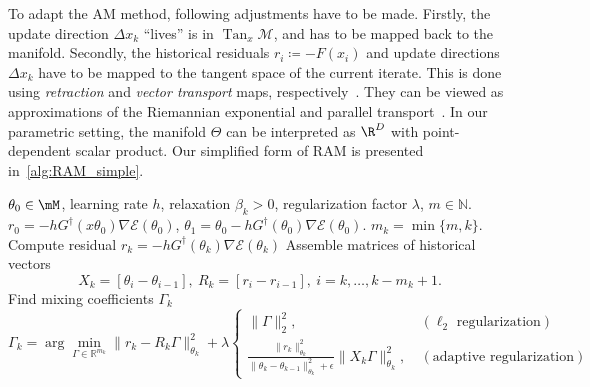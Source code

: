 \documentclass{article} %
\numberwithin{equation}{subsection}
\numberwithin{theorem}{section}
\newcommand{\cE}{\mathcal{E}}
\newcommand{\cM}{\mathcal{M}}
\begin{document}
            To adapt the AM method, following adjustments have to be made.
            Firstly, the update direction $\Delta x_k$ ``lives'' is in $\operatorname{Tan}_x{\cM}$, and has to be mapped back to the manifold.
            Secondly, the historical residuals $r_i \coloneqq  -F(x_i)$ and update directions $\Delta x_k$ have to be mapped to the tangent space of the current iterate.
            This is done using \emph{retraction} and \emph{vector transport} maps, respectively~\cite{absil2009optimization}.
            They can be viewed as approximations of the Riemannian exponential and parallel transport~\cite{absil2009optimization}.
            In our parametric setting, the manifold $\Theta$ can be interpreted as $\R^D$ with point-dependent scalar product. 
            Our simplified form of RAM is presented in~\autoref{alg:RAM_simple}.
            \begin{algorithm}[ht]
            \caption{Riemannian Anderson Mixing on $\Theta$}
            \label{alg:RAM_simple}
            \begin{algorithmic}[1]
                \REQUIRE $\theta_0 \in\mM$, 
                    learning rate $h$, 
                    relaxation $\beta_k > 0$, 
                    regularization factor $\lambda$,
                    $m\in\mathbb{N}$.
                \STATE $r_0 = -hG^\dagger(x\theta_0)\nabla\cE(\theta_0)$,
                $\theta_1 = \theta_0 -hG^\dagger(\theta_0)\nabla\cE(\theta_0)$.
                \STATE $m_k = \min\{m,k\}$.
                \STATE Compute residual $r_k = -hG^\dagger(\theta_k)\nabla \cE(\theta_k)$
                \STATE Assemble matrices of historical vectors
                    $$
                        X_k = \left[\theta_i - \theta_{i - 1}\right],\ 
                        R_k = \left[r_i - r_{i - 1}\right],\
                            i = k,\ldots,k - m_k + 1.
                    $$
                \STATE Find mixing coefficients $\Gamma_k$ \vspace{-10pt}
                \begin{equation*}
                    \Gamma_k = 
                        \arg\min_{\Gamma\in\mathbb{R}^{m_k}}\|r_k-R_k\Gamma\|^2_{\theta_k} 
                        + \lambda\begin{cases}
                            \|\Gamma\|^2_2,\ &(\ell_2 \text{ regularization}) \\
                             \frac{\|r_k\|^2_{\theta_k}}{\|\theta_k - \theta_{k-1} \|^2_{\theta_k}+\epsilon}\|X_k \Gamma\|_{\theta_k}^2,\ &(\text{adaptive regularization})

\end{cases}
\end{equation*}
\end{algorithmic}
\end{algorithm}
\end{document}
